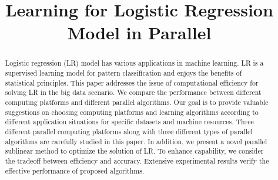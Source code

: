 \documentclass[10pt, conference, compsocconf]{IEEEtran}
\begin{document}
\title{Learning for Logistic Regression Model in Parallel}

\author{
\and
{}
\and
{}
\and
{}
\and
{}
}

\maketitle

\begin{abstract}
Logistic regression (LR) model has various applications in machine learning.
LR is a supervised learning model for pattern classification and enjoys the benefits of statistical principles.
This paper addresses the issue of computational efficiency for solving LR in the big data scenario.
We compare the performance between different computing platforms and different parallel algorithms.
Our goal is to provide valuable suggestions on choosing computing platforms and learning algorithms according to different application situations for specific datasets and machine resources.
Three different parallel computing platforms along with three different types of parallel algorithms are carefully studied in this paper.
In addition, we present a novel parallel sublinear method to optimize the solution of LR.
To enhance capability, we consider the tradeoff between efficiency and accuracy. Extensive experimental results verify the effective performance of proposed algorithms.
\end{abstract}
\end{document}
